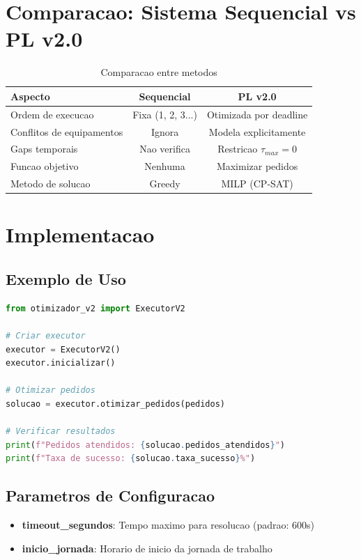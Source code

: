 \documentclass[12pt,a4paper]{article}
\begin{document}
\section{Comparacao: Sistema Sequencial vs PL v2.0}

\begin{table}[h]
\centering
\begin{tabular}{lcc}
\toprule
\textbf{Aspecto} & \textbf{Sequencial} & \textbf{PL v2.0} \\
\midrule
Ordem de execucao & Fixa (1, 2, 3...) & Otimizada por deadline \\
Conflitos de equipamentos & Ignora & Modela explicitamente \\
Gaps temporais & Nao verifica & Restricao $\tau_{max}=0$ \\
Funcao objetivo & Nenhuma & Maximizar pedidos \\
Metodo de solucao & Greedy & MILP (CP-SAT) \\
\bottomrule
\end{tabular}
\caption{Comparacao entre metodos}
\end{table}

\section{Implementacao}

\subsection{Exemplo de Uso}

\begin{lstlisting}[language=Python, basicstyle=\ttfamily\small]
from otimizador_v2 import ExecutorV2

# Criar executor
executor = ExecutorV2()
executor.inicializar()

# Otimizar pedidos
solucao = executor.otimizar_pedidos(pedidos)

# Verificar resultados
print(f"Pedidos atendidos: {solucao.pedidos_atendidos}")
print(f"Taxa de sucesso: {solucao.taxa_sucesso}%")
\end{lstlisting}

\subsection{Parametros de Configuracao}

\begin{itemize}
    \item \textbf{timeout\_segundos}: Tempo maximo para resolucao (padrao: 600s)
    \item \textbf{inicio\_jornada}: Horario de inicio da jornada de trabalho
\end{itemize}
\end{document}
